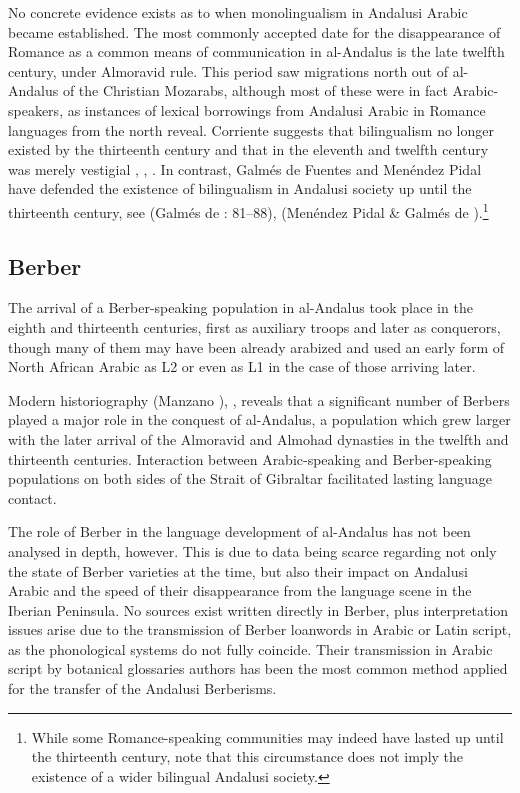 \documentclass[output=paper,modfonts,nonflat]{langsci/langscibook}
\begin{document}
No concrete evidence exists as to when monolingualism in Andalusi Arabic became established. The most commonly accepted date for the disappearance of Romance as a common means of communication in al-Andalus is the late twelfth century, under Almoravid rule. This period saw migrations north out of al-Andalus of the Christian Mozarabs, although most of these were in fact Arabic-speakers, as instances of lexical borrowings from Andalusi Arabic in Romance languages from the north reveal. Corriente suggests that bilingualism no longer existed by the thirteenth century and that in the eleventh and twelfth century was merely vestigial \citep{Corriente1997a}, \citep[443]{Corriente1992}, \citep{Corriente2005}. In contrast, Galmés de Fuentes and Menéndez Pidal have defended the existence of bilingualism in Andalusi society up until the thirteenth century, see (Galmés de \citealt{Fuentes1994}: 81–88), (Menéndez Pidal \& Galmés de \citealt{Fuentes2001}).\footnote{While some Romance-speaking communities may indeed have lasted up until the thirteenth century, note that this circumstance does not imply the existence of a wider bilingual Andalusi society.}  



\subsection{Berber}



The arrival of a Berber-speaking population in al-Andalus took place in the eighth and thirteenth centuries, first as auxiliary troops and later as conquerors, though many of them may have been already arabized and used an early form of North African Arabic as L2 or even as L1 in the case of those arriving later. 

Modern historiography (Manzano \citealt{Moreno1990}), \citep{Guichard1995}, \citep{Chalmeta2003} reveals that a significant number of Berbers played a major role in the conquest of al-Andalus, a population which grew larger with the later arrival of the Almoravid and Almohad dynasties in the twelfth and thirteenth centuries. Interaction between Arabic-speaking and Berber-speaking populations on both sides of the Strait of Gibraltar facilitated lasting language contact. 

The role of Berber in the language development of al-Andalus has not been analysed in depth, however. This is due to data being scarce regarding not only the state of Berber varieties at the time, but also their impact on Andalusi Arabic and the speed of their disappearance from the language scene in the Iberian Peninsula. No sources exist written directly in Berber, plus interpretation issues arise due to the transmission of Berber loanwords in Arabic or Latin script, as the phonological systems do not fully coincide. Their transmission in Arabic script by botanical glossaries authors has been the most common method applied for the transfer of the Andalusi Berberisms.  
\end{document}
